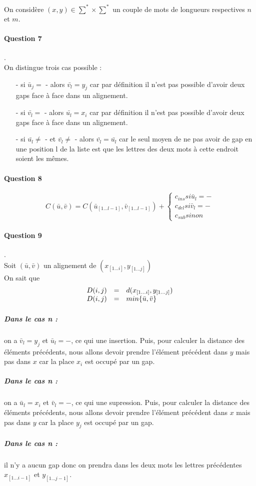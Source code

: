 On considère $(x,y)\in \sum^* \times \sum^*$ un couple de mots de longueurs respectives $n$ et $m$.
\paragraph{Question 7}.\\
On distingue trois cas possible :\begin{itemize}
\item[-] si $\bar{u}_j =$ - alors $\bar{v_l} = y_j$ car par définition il n'est pas possible d'avoir deux gaps face à face dans un alignement.
\item[-] si $\bar{v_l} =$ - alors $\bar{u_l} = x_i$ car par définition il n'est pas possible d'avoir deux gaps face à face dans un alignement.
\item[-] si $\bar{u_l} \neq$ - et $\bar{v_l} \neq$ - alors $\bar{v_l} = \bar{u_l}$ car le seul moyen de ne pas avoir de gap en une position l de la liste est que les lettres des deux mots à cette endroit soient les mêmes.
\end{itemize}
\paragraph{Question 8}
$$C(\bar u, \bar v) = C(\bar u_{[1...l-1]}, \bar v_{[1...l-1]}) + \left \{
    \begin{array}{rcl}
        c_{ins} si \bar u_l = -\\
        c_{del} si \bar v_l = -\\
        c_{sub} sinon
    \end{array}
\right.$$
\paragraph{Question 9}.\\
Soit $(\bar u, \bar v)$ un alignement de $(x_{[1...i]} ,y_{[1...j]})$\\
On sait que
$$
 \begin{array}{r c l}
      D(i,j) & = & d(x_{[1...i]} ,y_{[1...j]}) \\
      D(i,j) & = & min\{\bar u, \bar v\}\\
   \end{array}
$$
\subparagraph*{Dans le cas n :}on a $\bar v_l = y_j$ et $\bar u_l = -$, ce qui une insertion. Puis, pour calculer la distance des éléments précédents, nous allons devoir prendre l'élément précédent dans $y$ mais pas dans $x$ car la place $x_i$ est occupé par un gap.
\subparagraph*{Dans le cas n :}on a $\bar u_l = x_i$ et $\bar v_l = -$, ce qui une supression. Puis, pour calculer la distance des éléments précédents, nous allons devoir prendre l'élément précédent dans $x$ mais pas dans $y$ car la place $y_j$ est occupé par un gap.
\subparagraph*{Dans le cas n :}il n'y a aucun gap donc on prendra dans les deux mots les lettres précédentes $x_{[1...i-1]}$ et $y_{[1...j-1]}$.


